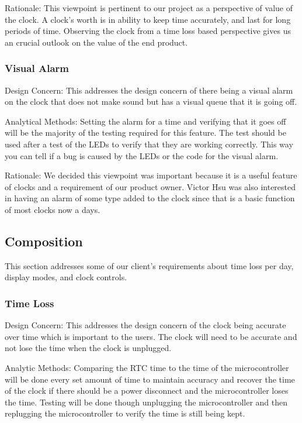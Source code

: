 \documentclass[10pt,draftclsnofoot,onecolumn]{IEEEtran}
\begin{document}
\hfill \break \indent Rationale: This viewpoint is pertinent to our project as a perspective of value of the clock.
A clock's worth is in ability to keep time accurately, and last for long periods of time.
Observing the clock from a time loss based perspective gives us an crucial outlook on the value of the end product.

\subsubsection{Visual Alarm}
\hfill \break \indent Design Concern: This addresses the design concern of there being a visual alarm on the clock that does not make sound but has a visual queue that it is going off.

\hfill \break \indent Analytical Methods: Setting the alarm for a time and verifying that it goes off will be the majority of the testing required for this feature.
The test should be used after a test of the LEDs to verify that they are working correctly.
This way you can tell if a bug is caused by the LEDs or the code for the visual alarm.

\hfill \break \indent Rationale: We decided this viewpoint was important because it is a useful feature of clocks and a requirement of our product owner.
Victor Hsu was also interested in having an alarm of some type added to the clock since that is a basic function of most clocks now a days.

\subsection{Composition}
This section addresses some of our client's requirements about time loss per day, display modes, and clock controls.

\subsubsection{Time Loss}
\hfill \break \indent Design Concern: This addresses the design concern of the clock being accurate over time which is important to the users.
The clock will need to be accurate and not lose the time when the clock is unplugged.

\hfill \break \indent Analytic Methods: Comparing the RTC time to the time of the microcontroller will be done every set amount of time to maintain accuracy and recover the time of the clock if there should be a power disconnect and the microcontroller loses the time.
Testing will be done though unplugging the microcontroller and then replugging the microcontroller to verify the time is still being kept.
\end{document}
